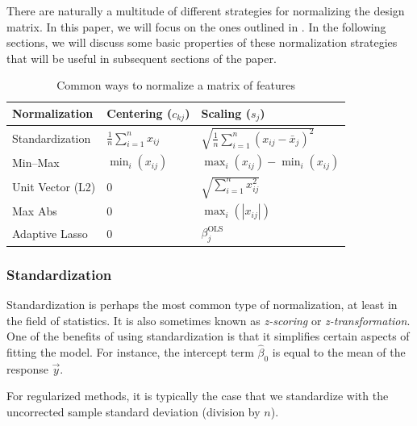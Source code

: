 There are naturally a multitude of different strategies for normalizing the design matrix. In this paper, we will focus on the ones outlined in .
In the following sections, we will discuss some basic properties of these normalization strategies that will be useful in subsequent sections of the paper.

\begin{table}[hbt]
  \centering
  \caption{Common ways to normalize a matrix of features}
  \label{tab:normalization-types}
  \begin{tabular}{lll}
    \toprule
    Normalization    & Centering (\(c_{kj}\))             & Scaling (\(s_j\))                                         \\
    \midrule
    Standardization  & \(\frac{1}{n}\sum_{i=1}^n x_{ij}\) & \(\sqrt{\frac{1}{n}\sum_{i=1}^n (x_{ij} - \bar{x}_j)^2}\) \\
    \addlinespace
    Min--Max         & \(\min_i(x_{ij})\)                 & \(\max_i(x_{ij}) - \min_i(x_{ij})\)                       \\
    \addlinespace
    Unit Vector (L2) & 0                                  & \(\sqrt{\sum_{i=1}^n x_{ij}^2}\)                          \\
    \addlinespace
    Max Abs          & 0                                  & \(\max_i(|x_{ij}|)\)                                      \\
    \addlinespace
    Adaptive Lasso   & 0                                  & \(\beta_j^\text{OLS}\)                                    \\
    \bottomrule
  \end{tabular}
\end{table}

\subsubsection{Standardization}

Standardization is perhaps the most common type of normalization, at least in the field of statistics. It is also sometimes known as \emph{z-scoring} or \emph{z-transformation}. One of the benefits of using standardization is that it simplifies certain aspects of fitting the model. For instance, the intercept term \(\hat\beta_0\) is equal to the mean of the response \(\vec y\).

For regularized methods, it is typically the case that we standardize with the uncorrected sample standard deviation (division by \(n\)).

